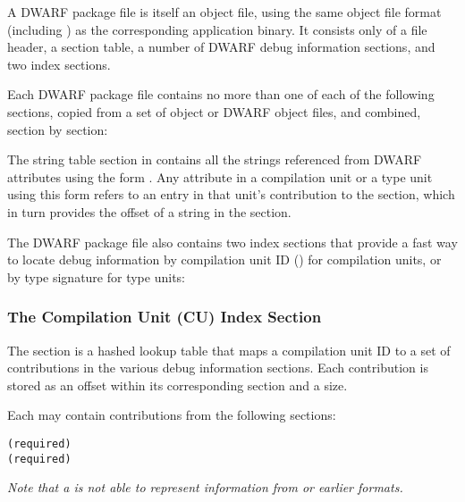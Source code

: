 A DWARF package file is itself an object file, using the
same object file format (including \byteorder) as the
corresponding application binary. It consists only of a file
header, a section table, a number of DWARF debug information
sections, and two index sections.

Each DWARF package file contains no more than one of each of the
following sections, copied from a set of object or DWARF object
files, and combined, section by section:
\begin{alltt}
    \dotdebuginfodwo
    \dotdebugabbrevdwo
    \dotdebuglinedwo
    \dotdebuglocdwo
    \dotdebugstroffsetsdwo
    \dotdebugstrdwo
    \dotdebugmacrodwo
\end{alltt}

The string table section in \dotdebugstrdwo{} contains all the
strings referenced from DWARF attributes using the form
\DWFORMstrx. Any attribute in a compilation unit or a type
unit using this form refers to an entry in that unit's
contribution to the \dotdebugstroffsetsdwo{} section, which in turn
provides the offset of a string in the \dotdebugstrdwo{}
section.

The DWARF package file also contains two index sections that
provide a fast way to locate debug information by compilation
unit ID (\DWATdwoid) for compilation units, or by type
signature for type units:
\begin{alltt}
    \dotdebugcuindex
    \dotdebugtuindex
\end{alltt}

\subsubsection{The Compilation Unit (CU) Index Section}
The \dotdebugcuindex{} section is a hashed lookup table that maps a
compilation unit ID to a set of contributions in the
various debug information sections. Each contribution is stored
as an offset within its corresponding section and a size.

Each \compunitset{} may contain contributions from the
following sections:
\begin{alltt}
    \dotdebuginfodwo{} (required)
    \dotdebugabbrevdwo{} (required)
    \dotdebuglinedwo
    \dotdebuglocdwo
    \dotdebugstroffsetsdwo
    \dotdebugmacrodwo
\end{alltt}

\textit{Note that a \compunitset{} is not able to represent \dotdebugmacinfo{}
information from \DWARFVersionIV{} or earlier formats.}

